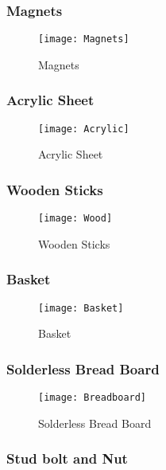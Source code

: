 \documentclass[12pt]{article}
\begin{document}
\subsubsection*{Magnets} \label{subsub:magnets}

\begin{figure}[H]
	\centering
	\texttt{[image: Magnets]}
	\caption{Magnets} \label{fig:magnets}
\end{figure}

\subsubsection*{Acrylic Sheet} \label{subsub:acrylic}

\begin{figure}[H]
	\centering
	\texttt{[image: Acrylic]}
	\caption{Acrylic Sheet} \label{fig:acrylic}
\end{figure}

\subsubsection*{Wooden Sticks} \label{subsub:sticks}

\begin{figure}[H]
	\centering
	\texttt{[image: Wood]}
	\caption{Wooden Sticks} \label{fig:sticks}
\end{figure}

\subsubsection*{Basket} \label{subsub:basket}

\begin{figure}[H]
	\centering
	\texttt{[image: Basket]}
	\caption{Basket} \label{fig:basket}
\end{figure}

\subsubsection*{Solderless Bread Board} \label{subsub:breadboard}

\begin{figure}[H]
	\centering
	\texttt{[image: Breadboard]}
	\caption{Solderless Bread Board} \label{fig:breadboard}
\end{figure}

\subsubsection*{Stud bolt and Nut} \label{subsub:stud}
\end{document}

